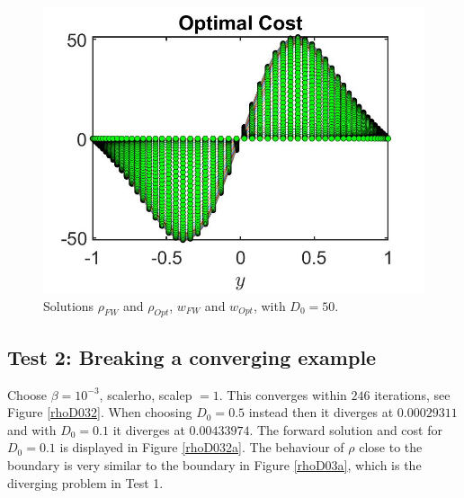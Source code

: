 \documentclass[11pt, a4paper]{article}
\theoremstyle{definition}
\begin{document}
\begin{figure}[h]
	\includegraphics[scale=0.3]{wFwOpt1.jpg}
	\caption{Solutions $\rho_{FW}$ and $\rho_{Opt}$, $w_{FW}$ and $w_{Opt}$,   with $D_0 = 50$.}
	\label{rhoD03}
\end{figure}

\subsection{Test 2: Breaking a converging example}
Choose $\beta = 10^{-3}$, scalerho, scalep $=1$. This converges within $246$ iterations, see Figure \ref{rhoD032}. When choosing $D_0 = 0.5$ instead then it diverges at $0.00029311$ and with $D_0 = 0.1$ it diverges at $0.00433974$. The forward solution and cost for $D_0=0.1$ is displayed in Figure \ref{rhoD032a}. The behaviour of $\rho$ close to the boundary is very similar to the boundary in Figure \ref{rhoD03a}, which is the diverging problem in Test 1. 
\end{document}
